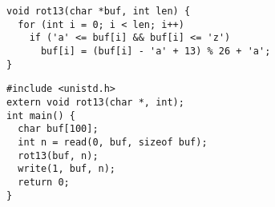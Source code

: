 
\vspace{-0.8em}
  \begin{verbatim}
void rot13(char *buf, int len) {
  for (int i = 0; i < len; i++)
    if ('a' <= buf[i] && buf[i] <= 'z')
      buf[i] = (buf[i] - 'a' + 13) % 26 + 'a';
}
  \end{verbatim}
\vspace{1em}
\vspace{-0.8em}
  \begin{verbatim}
#include <unistd.h>
extern void rot13(char *, int);
int main() {
  char buf[100];
  int n = read(0, buf, sizeof buf);
  rot13(buf, n);
  write(1, buf, n);
  return 0;
}
  \end{verbatim}
